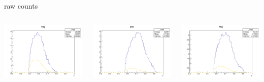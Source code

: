 \begin{frame}{raw counts}
\begin{columns}
\begin{column}[T]{0.25\textwidth}
\includegraphics[width = \textwidth]{results/yield/statistics/yield_x_Q2_z_0.60_4.775_0.60_neg.png}
\end{column}
\begin{column}[T]{0.25\textwidth}
\includegraphics[width = \textwidth]{results/yield/statistics/yield_x_Q2_z_0.60_4.775_0.70_pos.png}
\end{column}
\begin{column}[T]{0.25\textwidth}
\includegraphics[width = \textwidth]{results/yield/statistics/yield_x_Q2_z_0.60_4.775_0.70_neg.png}
\end{column}
\end{columns}
\end{frame}
